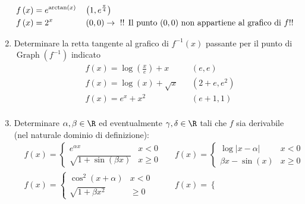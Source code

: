\begin{enumerate}
\begin{align*}
		       & f\left(x\right) = e^{\arctan \left(x\right)}            &  & \left(1, e^{\frac{\pi}{4}}\right)                                                                           \\
		       & f\left(x\right) = 2^{x}                                 &  & \left(0,0 \right)\rightarrow \text{ !! Il punto $ \left(0,0\right) $ non appartiene al grafico di $ f $!! }
	      \end{align*}
	\item Determinare la retta tangente al grafico di $ f ^{-1}\left(x\right) $ passante per il punto di $ \operatorname{Graph}\left(f ^{-1}\right) $ indicato
	      \begin{align*}
		       & f\left(x\right) = \log \left(\frac{x}{e}\right) + x &  & \left(e,e\right)        \\
		       & f\left(x\right) = \log \left(x\right) + \sqrt{ x}   &  & \left(2+e , e^2 \right) \\
		       & f\left(x\right) = e^{x} + x^2                       &  & \left(e+1, 1\right)     \\
	      \end{align*}
	\item Determinare $ \alpha , \beta  \in  \R  $ ed eventualmente $ \gamma, \delta \in  \R  $ tali che $ f $ sia derivabile (nel naturale dominio di definizione):
	      \begin{align*}
		       & f\left(x\right) = \begin{cases}
			                           e^{\alpha x}                         & x < 0    \\
			                           \sqrt{1 + \sin \left(\beta x\right)} & x \ge  0
		                           \end{cases} &   & f\left(x\right) =
		      \begin{cases}
			      \log \left|x - \alpha \right| & x <0    \\
			      \beta x - \sin \left(x\right) & x \ge 0
		      \end{cases}                              \\
		       & f\left(x\right) =
		      \begin{cases}
			      \cos ^2 \left(x + \alpha \right) & x < 0  \\
			      \sqrt{ 1 + \beta x^2 }           & \ge  0
		      \end{cases}
		       &                                                     &
		      f\left(x\right)=
		      \begin{cases}

\end{cases}
\end{align*}
\end{enumerate}
